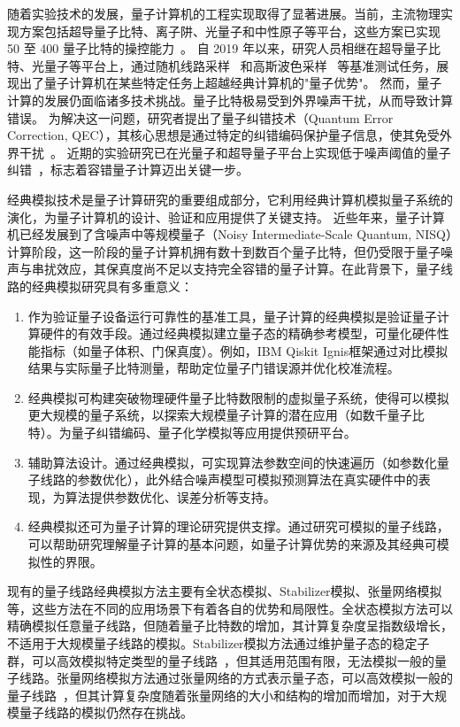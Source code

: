 随着实验技术的发展，量子计算机的工程实现取得了显著进展。当前，主流物理实现方案包括超导量子比特、离子阱、光量子和中性原子等平台，这些方案已实现 50 至 400 量子比特的操控能力~\cite{blatt2008quantum,devoret2013superconducting,wallraff2004strong,loss1998quantum}。
自 2019 年以来，研究人员相继在超导量子比特、光量子等平台上，通过随机线路采样~\cite{arute2019quantum} 和高斯波色采样~\cite{zhong2020quantum} 等基准测试任务，展现出了量子计算机在某些特定任务上超越经典计算机的"量子优势"。
然而，量子计算的发展仍面临诸多技术挑战。量子比特极易受到外界噪声干扰，从而导致计算错误。
为解决这一问题，研究者提出了量子纠错技术（Quantum Error Correction, QEC），其核心思想是通过特定的纠错编码保护量子信息，使其免受外界干扰~\cite{aharonov1997fault,aliferis2008fault}。
近期的实验研究已在光量子和超导量子平台上实现低于噪声阈值的量子纠错~\cite{ni2023beating,acharya2024quantum,sivak2023real}，标志着容错量子计算迈出关键一步。

经典模拟技术是量子计算研究的重要组成部分，它利用经典计算机模拟量子系统的演化，为量子计算机的设计、验证和应用提供了关键支持。
近些年来，量子计算机已经发展到了含噪声中等规模量子（Noisy Intermediate-Scale Quantum, NISQ）计算阶段，这一阶段的量子计算机拥有数十到数百个量子比特，但仍受限于量子噪声与串扰效应，其保真度尚不足以支持完全容错的量子计算。在此背景下，量子线路的经典模拟研究具有多重意义：
\begin{enumerate}
    \item 作为验证量子设备运行可靠性的基准工具，量子计算的经典模拟是验证量子计算硬件的有效手段。通过经典模拟建立量子态的精确参考模型，可量化硬件性能指标（如量子体积、门保真度）。例如，IBM Qiskit Ignis框架通过对比模拟结果与实际量子比特测量，帮助定位量子门错误源并优化校准流程。
    \item 经典模拟可构建突破物理硬件量子比特数限制的虚拟量子系统，使得可以模拟更大规模的量子系统，以探索大规模量子计算的潜在应用（如数千量子比特）。为量子纠错编码、量子化学模拟等应用提供预研平台。
    \item 辅助算法设计。通过经典模拟，可实现算法参数空间的快速遍历（如参数化量子线路的参数优化），此外结合噪声模型可模拟预测算法在真实硬件中的表现，为算法提供参数优化、误差分析等支持。
    \item 经典模拟还可为量子计算的理论研究提供支撑。通过研究可模拟的量子线路，可以帮助研究理解量子计算的基本问题，如量子计算优势的来源及其经典可模拟性的界限。
\end{enumerate}
现有的量子线路经典模拟方法主要有全状态模拟、Stabilizer模拟、张量网络模拟等，这些方法在不同的应用场景下有着各自的优势和局限性。全状态模拟方法可以精确模拟任意量子线路，但随着量子比特数的增加，其计算复杂度呈指数级增长，不适用于大规模量子线路的模拟。Stabilizer模拟方法通过维护量子态的稳定子群，可以高效模拟特定类型的量子线路~\cite{gottesman1998heisenberg,bravyi2016improved,bravyi2019simulation}，但其适用范围有限，无法模拟一般的量子线路。张量网络模拟方法通过张量网络的方式表示量子态，可以高效模拟一般的量子线路~\cite{pan2021simulating,pan2022solving,cheng2021mpdo}，但其计算复杂度随着张量网络的大小和结构的增加而增加，对于大规模量子线路的模拟仍然存在挑战。

